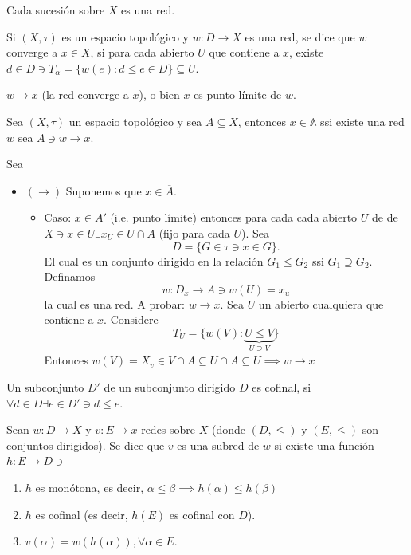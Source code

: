 \begin{nota}
    Cada sucesión sobre $X$ es una red. 
\end{nota}

\begin{definicion}[Convergencia]
    Si $(X,\tau)$ es un espacio topológico y $w:D\to X$ es una red, se dice que $w$ converge a $x\in X$, si para cada abierto $U$ que contiene a $x$, existe $d\in D\ni T_\alpha=\{w(e):d\leq e\in D\}\subseteq U$. 
\end{definicion}

\begin{nota}
    $w\to x$ (la red converge a $x$), o bien $x$ es punto límite de $w$. 
\end{nota}

\begin{teorema}
    Sea $(X,\tau)$ un espacio topológico y sea $A\subseteq X$, entonces $x\in \mathbb{A}$ ssi existe una red $w$ sea $A\ni w\to x$.
    \begin{dem}
        Sea 
        \begin{itemize}
            \item $(\to)$ Suponemos que $x\in\overline{A}$. 
            \begin{itemize}
                \item Caso: $x\in A'$ (i.e. punto límite) entonces para cada cada abierto $U$ de de $X\ni x\in U\exists x_U\in U\cap A$ (fijo para cada $U$). Sea 
                $$D=\{G\in \tau \ni x\in G\}.$$
                El cual es un conjunto dirigido en la relación $G_1\leq G_2$ ssi $G_1\supseteq G_2$. Definamos $$w:D_x\to A\ni w(U)=x_u$$
                la cual es una red. A probar: $w\to x$. Sea $U$ un abierto cualquiera que contiene a $x$. Considere 
                $$T_U=\{w(V):\underbrace{U\leq V}_{U\supseteq V}\}$$ 
                Entonces $w(V)=X_v\in V\cap A\subseteq U\cap A\subseteq U\implies w\to x$
            \end{itemize}
        \end{itemize}
    \end{dem}
\end{teorema}


\begin{nota}
    Un subconjunto $D'$ de un subconjunto dirigido $D$ es cofinal, si $\forall d\in D\exists e\in D'\ni d\leq e$. 
\end{nota}
\begin{definicion}
    Sean $w:D\to X$ y $v: E\to x$ redes sobre $X$ (donde $(D,\leq)$ y $(E,\leq )$ son conjuntos dirigidos). Se dice que $v$ es una subred de $w$ si existe una función $h:E\to D\ni$ 
    \begin{enumerate}
        \item $h$ es monótona, es decir, $\alpha\leq \beta\implies h(\alpha)\leq h(\beta)$
        \item $h$ es cofinal (es decir, $h(E)$ es cofinal con $D$).
        \item $v(\alpha)=w(h(\alpha)),\forall \alpha\in E$.
    \end{enumerate}
    
\end{definicion}


